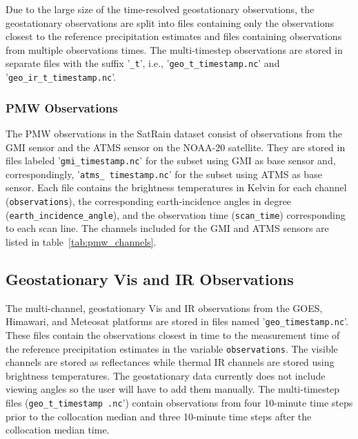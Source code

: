 \documentclass[11pt]{article}
\begin{document}
Due to the large size of the time-resolved geostationary observations, the
geostationary observations are split into files containing only the observations
closest to the reference precipitation estimates and files containing
observations from multiple observations times. The multi-timestep observations
are stored in separate files with the suffix '\texttt{\_t}', i.e.,
'\texttt{geo\_t\_\textlangle timestamp\textrangle.nc}' and '\texttt{geo\_ir\_t\_\textlangle timestamp\textrangle.nc}'.

\subsubsection{PMW Observations}

The PMW observations in the SatRain dataset consist of observations from the GMI
sensor and the ATMS sensor on the NOAA-20 satellite. They are stored in files
labeled '\texttt{gmi\_\textlangle timestamp\textrangle.nc}' for the subset using
GMI as base sensor and, correspondingly, '\texttt{atms\_\textlangle
  timestamp\textrangle.nc}' for the subset using ATMS as base sensor. Each file
contains the brightness temperatures in Kelvin for each channel
(\texttt{observations}), the corresponding earth-incidence angles in degree
(\texttt{earth\_incidence\_angle}), and the observation time
(\texttt{scan\_time}) corresponding to each scan line. The channels included for
the GMI and ATMS sensors are listed in table~\ref{tab:pmw_channels}.

\subsection{Geostationary Vis and IR Observations}

The multi-channel, geostationary Vis and IR observations from the GOES,
Himawari, and Meteosat platforms are stored in files named
'\texttt{geo\_\textlangle timestamp\textrangle.nc}'. These files contain the
observations closest in time to the measurement time of the reference
precipitation estimates in the variable \texttt{observations}. The visible
channels are stored as reflectances while thermal IR channels are stored using
brightness temperatures. The geostationary data currently does not include
viewing angles so the user will have to add them manually. The multi-timestep
files (\texttt{geo\_t\_\textlangle timestamp \textrangle.nc}') contain
observations from four 10-minute time steps prior to the collocation median and
three 10-minute time steps after the collocation median time.
\end{document}
